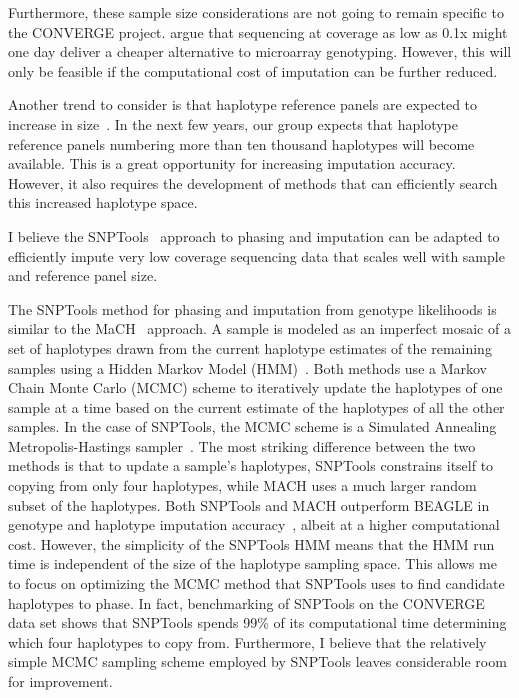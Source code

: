 \documentclass[a4paper]{article}
\begin{document}
Furthermore, these sample size considerations are not going to remain specific to
the CONVERGE project. \Textcite{Pasaniuc2012} argue that sequencing at
coverage as low as 0.1x might one day deliver a cheaper alternative to microarray
genotyping. However, this will only be feasible if the computational
cost of imputation can be further reduced.

Another trend to consider is that haplotype reference panels
are expected to increase in size~\autocite{Li2010}. In the next few
years, our group expects that haplotype reference panels numbering
more than ten thousand haplotypes will become available.  This is a
great opportunity for increasing
imputation accuracy. However, it also requires the development of
methods that can efficiently search this increased haplotype space.

I believe the SNPTools~\autocite{Wang2013} approach to phasing and
imputation can be adapted to efficiently impute very low coverage sequencing
data that scales well with sample and reference panel size.

The SNPTools method for phasing and imputation from genotype
likelihoods is similar to the MaCH~\autocite{Li2010} approach.  A
sample is modeled as an imperfect mosaic of a set of haplotypes drawn
from the current haplotype estimates of the remaining
samples using a Hidden Markov Model (HMM)~\autocite{Li2003}. Both
methods use a Markov Chain Monte Carlo (MCMC) scheme to iteratively
update the haplotypes of one sample at a 
time based on the current estimate of the haplotypes of all the other
samples. In the case of SNPTools, the MCMC scheme is a
Simulated Annealing Metropolis-Hastings sampler~\autocite{Kirkpatrick1983}.
The most
striking difference between the two methods is that to update a
sample's haplotypes, SNPTools constrains itself to copying from only
four haplotypes, while MACH uses a much larger random subset of the haplotypes.
Both SNPTools and MACH
outperform BEAGLE in genotype and haplotype imputation
accuracy~\autocite{Wang2013, Li2010}, albeit at a higher computational
cost.
However, the simplicity of the SNPTools HMM means that the HMM run time is
independent of the size of the haplotype sampling space. This allows
me to focus on optimizing the MCMC method that SNPTools uses to find
candidate haplotypes to phase.
In fact, benchmarking of SNPTools on
the CONVERGE data set shows that SNPTools spends 99\% of its
computational time determining which four haplotypes to copy
from.
Furthermore, I believe that the relatively simple MCMC sampling scheme
employed by SNPTools leaves considerable room for improvement.
\end{document}
